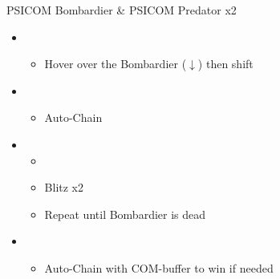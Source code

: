 	\vfill
	\begin{battle}[0:26]{PSICOM Bombardier \& PSICOM Predator x2}
		\begin{itemize}
			\item \first
			      \begin{itemize}
				      \item Hover over the Bombardier ($\downarrow$) then shift
			      \end{itemize}
			\item \second
			      \begin{itemize}
				      \item Auto-Chain
			      \end{itemize}
			\item \first
			      \begin{itemize}
				      \item \stagger
				      \item Blitz x2
				      \item Repeat until Bombardier is dead
			      \end{itemize}
			\item \second
			      \begin{itemize}
				      \item Auto-Chain with COM-buffer to win if needed
			      \end{itemize}
		\end{itemize}
		 
	\end{battle}

	


